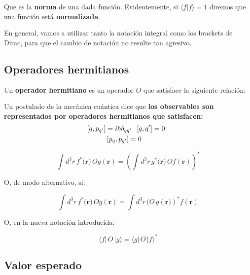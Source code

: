 Que es la \textbf{norma} de una dada función. Evidentemente, si $    \langle f |f \rangle=1$ diremos que una función está \textbf{normalizada}.

En general, vamos a utilizar tanto la notación integral como los brackets de Dirac, para que el cambio de notación no resulte tan agresivo.

\subsection{\textbf{Operadores hermitianos}}

Un \textbf{operador hermitiano} es un operador $O$ que satisface la siguiente relación:

\begin{marginfigure}
\begin{qbox}{}
    Un postulado de la mecánica cuántica dice que \textbf{los observables son representados por operadores hermitianos que satisfacen:}
    \begin{equation*}
    \begin{split}
        \left[q,p_{q'}\right]& = i\hbar \delta_{qq'} \hspace{0.2cm} \left[q,q'\right]=0 \hspace{0.2cm}\\ &\left[p_q,p_{q'}\right]=0
    \end{split}
    \end{equation*}
\end{qbox}
\end{marginfigure}

\begin{equation}
    \int d^3r \, f^*(\mathbf{r)} \,O g(\mathbf{r})=\left(\int d^3r \, g^*(\mathbf{r)} \,O f(\mathbf{r})\right)^*
\end{equation}

O, de modo alternativo, si:

\begin{equation}
    \int d^3r \, f^*(\mathbf{r)} \,O g(\mathbf{r})=\int d^3r \, (O\,g(\mathbf{r)})^* f(\mathbf{r})
\end{equation}

O, en la nueva notación introducida:

\begin{equation}
        \langle f |\,O\,|g \rangle=    \langle g |\,O\,|f \rangle^*
\end{equation}

\subsection{\textbf{Valor esperado}}

